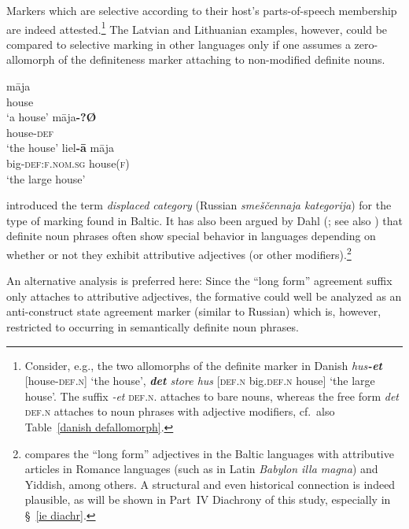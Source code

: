 Markers which are selective according to their host's parts-of-speech membership are indeed attested.\footnote{Consider, e.g., the two allomorphs of the definite marker in Danish \textit{hus\textbf{-et}} [house-\textsc{def.n}] ‘the house’, \textit{\textbf{det} store hus} [\textsc{def.n} big\textsc{.def.n} house] ‘the large house’. The suffix \textit{-et} \textsc{def.n.} attaches to bare nouns, whereas the free form \textit{det} \textsc{def.n} attaches to noun phrases with adjective modifiers, cf.~also Table~\ref{danish defallomorph}.} The Latvian and Lithuanian examples, however, could be compared to selective marking in other languages only if one assumes a zero-allomorph of the definiteness marker attaching to non-modified definite nouns.
\begin{exe}
\ex
{}
\begin{xlist}
\ex
\gll 	māja\\
	house\\
\glt	‘a house’
\ex	
\gll 	māja\textbf{-?Ø}\\
	house-\textsc{def}\\
\glt	‘the house’
\ex		
\gll 	liel\textbf{-ā} māja\\
	big-\textsc{def:f.nom.sg} house(\textsc{f})\\
\glt	‘the large house’
\end{xlist}
\end{exe}
\citet[31]{melcuk1998} introduced the term \emph{displaced category} (Russian \emph{smeščennaja kategorija}) for the type of marking found in Baltic. It has also been argued by Dahl (\citeyear[149–152]{dahl2003}; see also \citealt[122–123]{dahl2015a}) that definite noun phrases often show special behavior in languages depending on whether or not they exhibit attributive adjectives (or other modifiers).\footnote{\citet[150]{dahl2003} compares the “long form” adjectives in the Baltic languages with attributive articles in Romance languages (such as in Latin \textit{Babylon illa magna}) and Yiddish, among others. A structural and even historical connection is indeed plausible, as will be shown in Part~IV Diachrony of this study, especially in \S~\ref{ie diachr}.}

An alternative analysis is preferred here: Since the “long form” agreement suffix only attaches to attributive adjectives, the formative could well be analyzed as an anti\hyp{}construct state agreement marker (similar to Russian) which is, however, restricted to occurring in semantically definite noun phrases. 

